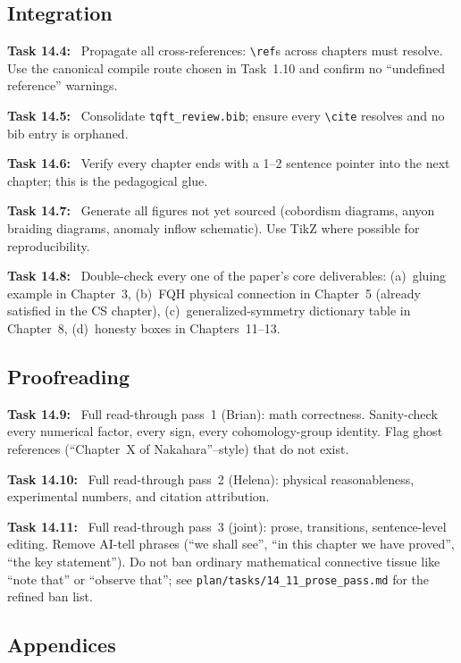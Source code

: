 \documentclass[11pt]{article}
\newcommand{\task}[1]{\medskip\noindent\textbf{Task #1:}\ }
\begin{document}
\subsection{Integration}

\task{14.4} Propagate all cross-references: \texttt{\textbackslash ref}s across chapters
must resolve. Use the canonical compile route chosen in Task~1.10 and confirm no
``undefined reference'' warnings.

\task{14.5} Consolidate \texttt{tqft\_review.bib}; ensure every \texttt{\textbackslash cite}
resolves and no bib entry is orphaned.

\task{14.6} Verify every chapter ends with a 1--2 sentence pointer into the next chapter;
this is the pedagogical glue.

\task{14.7} Generate all figures not yet sourced (cobordism diagrams, anyon braiding
diagrams, anomaly inflow schematic). Use TikZ where possible for reproducibility.

\task{14.8} Double-check every one of the paper's core deliverables:
(a)~gluing example in Chapter~3, (b)~FQH physical connection in Chapter~5 (already
satisfied in the CS chapter), (c)~generalized-symmetry dictionary table in Chapter~8,
(d)~honesty boxes in Chapters~11--13.

\subsection{Proofreading}

\task{14.9} Full read-through pass~1 (Brian): math correctness. Sanity-check every
numerical factor, every sign, every cohomology-group identity. Flag ghost
references (``Chapter~X of Nakahara''--style) that do not exist.

\task{14.10} Full read-through pass~2 (Helena): physical reasonableness, experimental
numbers, and citation attribution.

\task{14.11} Full read-through pass~3 (joint): prose, transitions, sentence-level
editing. Remove AI-tell phrases (``we shall see'', ``in this chapter we have proved'',
``the key statement''). Do not ban ordinary mathematical connective tissue like ``note
that'' or ``observe that''; see \texttt{plan/tasks/14\_11\_prose\_pass.md} for the refined
ban list.

\subsection{Appendices}
\end{document}
